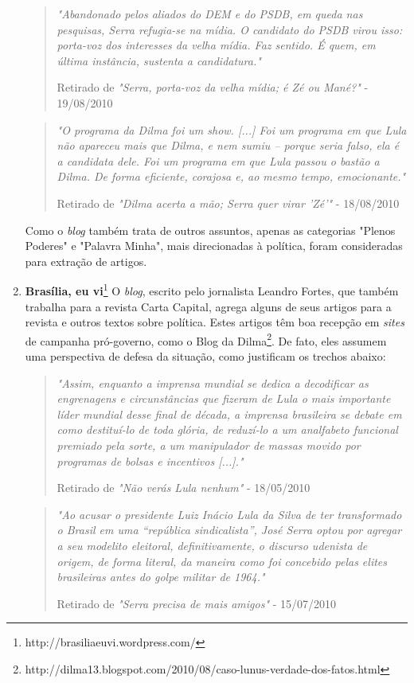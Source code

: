 \begin{enumerate}
\begin{quote}

\emph{"Abandonado pelos aliados do DEM e do PSDB, em queda nas pesquisas, Serra refugia-se na mídia. O candidato do PSDB virou isso: porta-voz dos interesses da velha mídia. Faz sentido. É quem, em última instância, sustenta a candidatura."}

{\small Retirado de \emph{"Serra, porta-voz da velha mídia; é Zé ou Mané?"} - 19/08/2010}
\end{quote}

\begin{quote}
\emph{"O programa da Dilma foi um show. [...] Foi um programa em que Lula não apareceu mais que Dilma, e nem sumiu – porque seria falso, ela é a candidata dele. Foi um programa em que Lula passou o bastão a Dilma. De forma eficiente, corajosa e, ao mesmo tempo, emocionante."}

{\small Retirado de \emph{"Dilma acerta a mão; Serra quer virar 'Zé'"} - 18/08/2010}

\end{quote}

Como o \emph{blog} também trata de outros assuntos, apenas as categorias "Plenos Poderes" e "Palavra Minha", mais direcionadas à política, foram consideradas para extração de artigos.

\item \textbf{Brasília, eu vi}\footnote{http://brasiliaeuvi.wordpress.com/} O \emph{blog}, escrito pelo jornalista Leandro Fortes, que também trabalha para a revista Carta Capital, agrega alguns de seus artigos para a revista e outros textos sobre política. Estes artigos têm boa recepção em \emph{sites} de campanha pró-governo, como o Blog da Dilma\footnote{http://dilma13.blogspot.com/2010/08/caso-lunus-verdade-dos-fatos.html}. De fato, eles assumem uma perspectiva de defesa da situação, como justificam os trechos abaixo:


\begin{quote}
\emph{"Assim, enquanto a imprensa mundial se dedica a decodificar as engrenagens e circunstâncias que fizeram de Lula o mais importante líder mundial desse final de década, a imprensa brasileira se debate em como destituí-lo de toda glória, de reduzí-lo a um analfabeto funcional premiado pela sorte, a um manipulador de massas movido por programas de bolsas e incentivos [...]."}

{\small Retirado de \emph{"Não verás Lula nenhum"} - 18/05/2010}
\end{quote}

\begin{quote}

\emph{"Ao acusar o presidente Luiz Inácio Lula da Silva de ter transformado o Brasil em uma “república sindicalista”, José Serra optou por agregar a seu modelito eleitoral, definitivamente, o discurso udenista de origem, de forma literal, da maneira como foi concebido pelas elites brasileiras antes do golpe militar de 1964."}

{\small Retirado de \emph{"Serra precisa de mais amigos"} - 15/07/2010}
\end{quote}
\end{enumerate}


